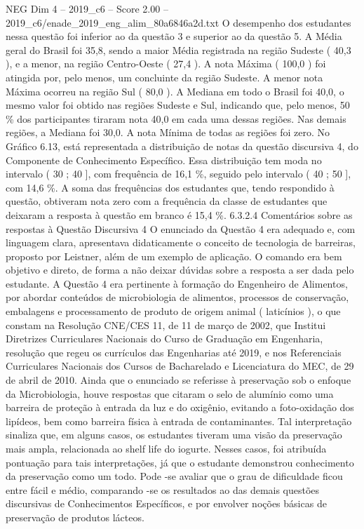 \begin{textsample}{NEG Dim 4 – 2019\_c6 – Score 2.00 – 2019\_c6/enade\_2019\_eng\_alim\_80a6846a2d.txt}
O desempenho dos estudantes nessa questão foi inferior ao da questão 3 e superior ao da questão 5.
A Média geral do Brasil foi 35,8, sendo a maior Média registrada na região Sudeste ( 40,3 ), e a menor, na região Centro-Oeste ( 27,4 ).
A nota Máxima ( 100,0 ) foi atingida por, pelo menos, um concluinte da região Sudeste.
A menor nota Máxima ocorreu na região Sul ( 80,0 ).
A Mediana em todo o Brasil foi 40,0, o mesmo valor foi obtido nas regiões Sudeste e Sul, indicando que, pelo menos, 50 \% dos participantes tiraram nota 40,0 em cada uma dessas regiões.
Nas demais regiões, a Mediana foi 30,0.
A nota Mínima de todas as regiões foi zero.
No Gráfico 6.13, está representada a distribuição de notas da questão discursiva 4, do Componente de Conhecimento Específico.
Essa distribuição tem moda no intervalo ( 30 ; 40 ], com frequência de 16,1 \%, seguido pelo intervalo ( 40 ; 50 ], com 14,6 \%.
A soma das frequências dos estudantes que, tendo respondido à questão, obtiveram nota zero com a frequência da classe de estudantes que deixaram a resposta à questão em branco é 15,4 \%. 6.3.2.4 Comentários sobre as respostas à Questão Discursiva 4 O enunciado da Questão 4 era adequado e, com linguagem clara, apresentava didaticamente o conceito de tecnologia de barreiras, proposto por Leistner, além de um exemplo de aplicação.
O comando era bem objetivo e direto, de forma a não deixar dúvidas sobre a resposta a ser dada pelo estudante.
A Questão 4 era pertinente à formação do Engenheiro de Alimentos, por abordar conteúdos de microbiologia de alimentos, processos de conservação, embalagens e processamento de produto de origem animal ( laticínios ), o que constam na Resolução CNE/CES 11, de 11 de março de 2002, que Institui Diretrizes Curriculares Nacionais do Curso de Graduação em Engenharia, resolução que regeu os currículos das Engenharias até 2019, e nos Referenciais Curriculares Nacionais dos Cursos de Bacharelado e Licenciatura do MEC, de 29 de abril de 2010.
Ainda que o enunciado se referisse à preservação sob o enfoque da Microbiologia, houve respostas que citaram o selo de alumínio como uma barreira de proteção à entrada da luz e do oxigênio, evitando a foto-oxidação dos lipídeos, bem como barreira física à entrada de contaminantes.
Tal interpretação sinaliza que, em alguns casos, os estudantes tiveram uma visão da preservação mais ampla, relacionada ao shelf life do iogurte.
Nesses casos, foi atribuída pontuação para tais interpretações, já que o estudante demonstrou conhecimento da preservação como um todo.
Pode -se avaliar que o grau de dificuldade ficou entre fácil e médio, comparando -se os resultados ao das demais questões discursivas de Conhecimentos Específicos, e por envolver noções básicas de preservação de produtos lácteos.

\end{textsample}
